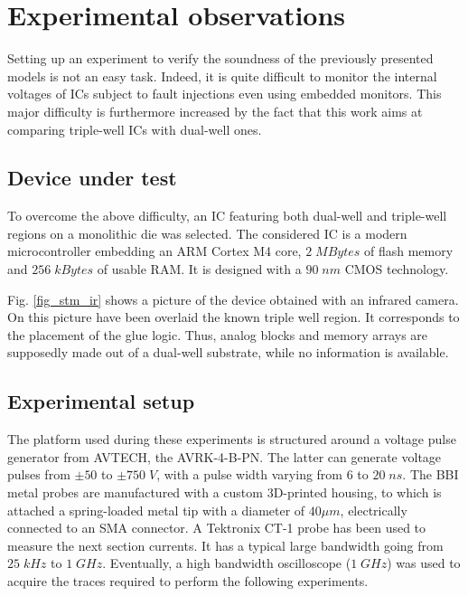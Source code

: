 \documentclass[10pt, conference, compsocconf]{IEEEtran}
\begin{document}
\section{Experimental observations}
\label{section:xp}
Setting up an experiment to verify the soundness of the previously presented models is not an easy task. Indeed, it is quite difficult to monitor the internal voltages of ICs subject to fault injections even using embedded monitors. This major difficulty is furthermore increased by the fact that this work aims at comparing triple-well ICs with dual-well ones.

\subsection{Device under test}
To overcome the above difficulty, an IC featuring both dual-well and triple-well regions on a monolithic die was selected. The considered IC is a modern microcontroller embedding an ARM Cortex M4 core, $2 \; MBytes$ of flash memory and $256 \; kBytes$ of usable RAM. It is designed with a $90 \; nm$ CMOS technology.

Fig. \ref{fig_stm_ir} shows a picture of the device obtained with an infrared camera. On this picture have been overlaid the known triple well region. It corresponds to the placement of the glue logic. Thus, analog blocks and memory arrays are supposedly made out of a dual-well substrate, while no information is available.

\subsection{Experimental setup}
The platform used during these experiments is structured around a voltage pulse generator from AVTECH, the AVRK-4-B-PN. The latter can generate voltage pulses from $\pm 50$ to $\pm 750 \; V$, with a pulse width varying from $6$ to $20 \; ns$. The BBI metal probes are manufactured with a custom 3D-printed housing, to which is attached a spring-loaded metal tip with a diameter of $40 \mu m$, electrically connected to an SMA connector. A Tektronix CT-1 probe has been used to measure the next section currents. It has a typical large bandwidth going from $25 \; kHz$ to $1 \; GHz$. Eventually, a high bandwidth oscilloscope ($1 \; GHz$) was used to acquire the traces required to perform the following experiments. 
\end{document}
